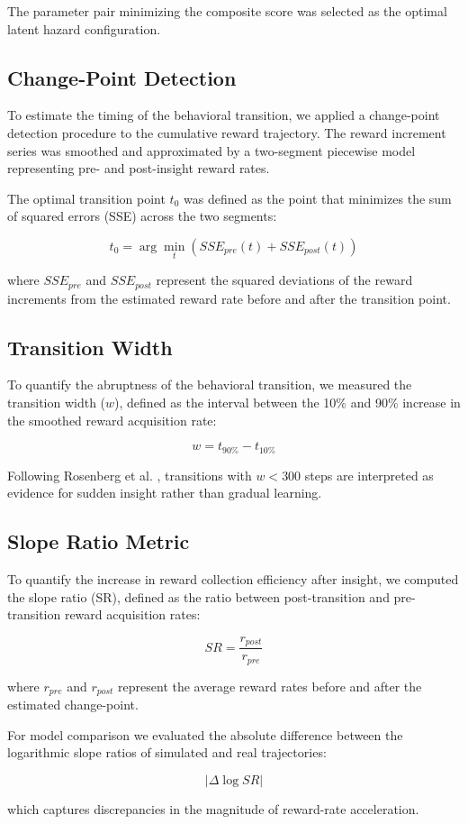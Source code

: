 The parameter pair minimizing the composite score was selected as the 
optimal latent hazard configuration.
\subsection{Change-Point Detection}

To estimate the timing of the behavioral transition, we applied a 
change-point detection procedure to the cumulative reward trajectory. 
The reward increment series was smoothed and approximated by a 
two-segment piecewise model representing pre- and post-insight reward rates.

The optimal transition point $t_0$ was defined as the point that minimizes 
the sum of squared errors (SSE) across the two segments:

\begin{equation}
t_0 = \arg\min_{t} (SSE_{pre}(t) + SSE_{post}(t))
\end{equation}

where $SSE_{pre}$ and $SSE_{post}$ represent the squared deviations of the 
reward increments from the estimated reward rate before and after the 
transition point.
\subsection{Transition Width}

To quantify the abruptness of the behavioral transition, we measured the 
transition width ($w$), defined as the interval between the 10\% and 90\% 
increase in the smoothed reward acquisition rate:

\begin{equation}
w = t_{90\%} - t_{10\%}
\end{equation}

Following Rosenberg et al. \cite{rosenberg2021mice}, transitions with $w < 300$ steps are interpreted as evidence for sudden insight rather than gradual learning.
\subsection{Slope Ratio Metric}

To quantify the increase in reward collection efficiency after insight, 
we computed the slope ratio (SR), defined as the ratio between post-transition 
and pre-transition reward acquisition rates:

\begin{equation}
SR = \frac{r_{post}}{r_{pre}}
\end{equation}

where $r_{pre}$ and $r_{post}$ represent the average reward rates before 
and after the estimated change-point.

For model comparison we evaluated the absolute difference between the 
logarithmic slope ratios of simulated and real trajectories:

\begin{equation}
|\Delta \log SR|
\end{equation}

which captures discrepancies in the magnitude of reward-rate acceleration.